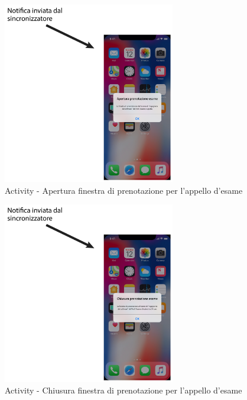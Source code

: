 \begin{figure}
	\centering
	\includegraphics[width=0.67\textwidth]{imgs/gruppo2/activity-notifiche-apertura-prenotazione-esame}
	\caption{Activity - Apertura finestra di prenotazione per l'appello d'esame}
	\label{fig:activity-notifiche-apertura-finestra-esame}
\end{figure}

\begin{figure}
	\centering
	\includegraphics[width=0.67\textwidth]{imgs/gruppo2/activity-notifiche-chiusura-prenotazione-esame}
	\caption{Activity - Chiusura finestra di prenotazione per l'appello d'esame}
	\label{fig:activity-notifiche-chiusura-finestra-esame}
\end{figure}

